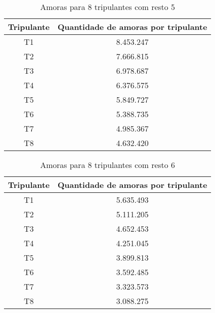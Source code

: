 \documentclass[12pt]{article}
\begin{document}
\begin{table}[H]

\centering

\begin{tabular}{|c|c|}

\hline
Tripulante & Quantidade de amoras por tripulante \\
\hline
T1 & 8.453.247 \\
\hline
T2 & 7.666.815 \\
\hline
T3 & 6.978.687 \\
\hline
T4 & 6.376.575 \\
\hline
T5 & 5.849.727 \\
\hline
T6 & 5.388.735 \\
\hline
T7 & 4.985.367 \\
\hline
T8 & 4.632.420 \\
\hline

\end{tabular}
\label{Tabela9}
\caption{Amoras para 8 tripulantes com resto 5}

\end{table}

\begin{table}[H]

\centering

\begin{tabular}{|c|c|}

\hline
Tripulante & Quantidade de amoras por tripulante \\
\hline
T1 & 5.635.493 \\
\hline
T2 & 5.111.205 \\
\hline
T3 & 4.652.453 \\
\hline
T4 & 4.251.045 \\
\hline
T5 & 3.899.813 \\
\hline
T6 & 3.592.485 \\
\hline
T7 & 3.323.573 \\
\hline
T8 & 3.088.275 \\
\hline

\end{tabular}
\label{Tabela10}
\caption{Amoras para 8 tripulantes com resto 6}

\end{table}
\end{document}
